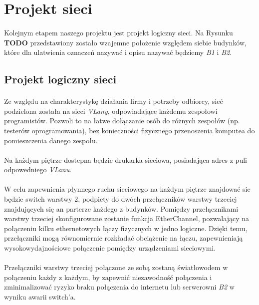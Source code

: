 \newpage
\section{Projekt sieci}
\paragraph{}
Kolejnym etapem naszego projektu jest projekt logiczny sieci. Na Rysunku \textbf{TODO} przedstawiony zostało wzajemne położenie względem siebie budynków, które dla ulatwienia oznaczeń nazywać i opisu nazywać będziemy \textit{B1} i \textit{B2}.

\subsection{Projekt logiczny sieci}
\paragraph{}
Ze względu na charakterystykę działania firmy i potrzeby odbiorcy, sieć podzielona została na sieci \textit{VLany}, odpowiadające każdemu zespołowi programistów. Pozwoli to na łatwe dołączanie osób do różnych zespołów (np. testerów oprogramowania), bez konieczności fizycznego przenoszenia komputea do pomieszczenia danego zespołu.

\paragraph{}
Na każdym piętrze dostepna będzie drukarka sieciowa, posiadająca adres z puli odpowedniego \textit{VLanu}.

\paragraph{}
W celu zapewnienia płynnego ruchu sieciowego na każdym piętrze znajdować sie będzie switch warstwy 2, podpiety do dwóch przełączników warstwy trzeciej znajdujących się an parterze każdego z budynków. Pomiędzy przełącznikami warstwy trzeciej skonfigurowane zostanie funkcja EtherChannel, pozwalający na połączeniu kilku ethernetowych łączy fizycznych w jedno logiczne. Dzięki temu, przełączniki mogą równomiernie rozkładać obciążenie na łączu, zapewnieniają wysokowydajnościowe połączenie pomiędzy urządzeniami sieciowymi.

\paragraph{}
Przełączniki warstwy trzeciej połączone ze sobą zostaną światłowodem w połączeniu każdy z każdym, by zapewnić niezawodność połączenia i zminimalizować ryzyko braku połączenia do internetu lub serwerowni \textit{B2} w wyniku awarii switch'a.

